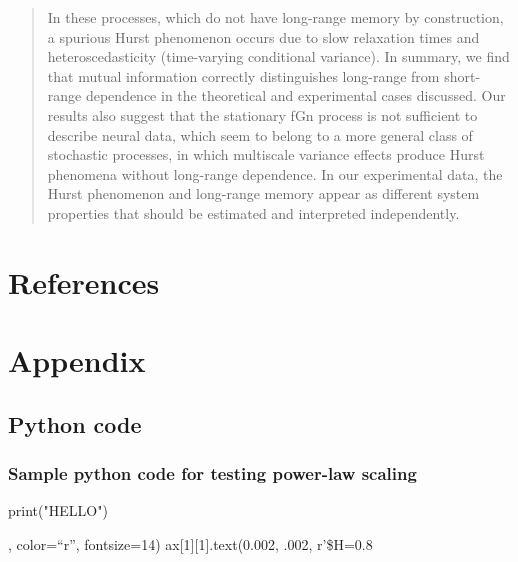 \documentclass[
  sn-vancouver,
  Numbered,
  referee,
  lineno]{sn-jnl}
\newenvironment{Shaded}{\begin{snugshade}}{\end{snugshade}}
\newcommand{\BuiltInTok}[1]{\textcolor[rgb]{0.00,0.23,0.31}{#1}}
\newcommand{\NormalTok}[1]{\textcolor[rgb]{0.00,0.23,0.31}{#1}}
\newcommand{\StringTok}[1]{\textcolor[rgb]{0.13,0.47,0.30}{#1}}
\begin{document}
\begin{quote}
In these processes, which do not have long-range memory by construction,
a spurious Hurst phenomenon occurs due to slow relaxation times and
heteroscedasticity (time-varying conditional variance). In summary, we
find that mutual information correctly distinguishes long-range from
short-range dependence in the theoretical and experimental cases
discussed. Our results also suggest that the stationary fGn process is
not sufficient to describe neural data, which seem to belong to a more
general class of stochastic processes, in which multiscale variance
effects produce Hurst phenomena without long-range dependence. In our
experimental data, the Hurst phenomenon and long-range memory appear as
different system properties that should be estimated and interpreted
independently.
\end{quote}

\newpage{}

\section{References}\label{references}

\renewcommand{\bibsection}{}


\newpage{}

\section{Appendix}\label{appendix}

\subsection{Python code}\label{python-code}

\subsubsection{Sample python code for testing power-law
scaling}\label{sec-powerlawscalingcode}

\begin{Shaded}
\begin{Highlighting}[]
\BuiltInTok{print}\NormalTok{(}\StringTok{"HELLO"}\NormalTok{)}
\end{Highlighting}
\end{Shaded}

, color=``r'', fontsize=14) ax{[}1{]}{[}1{]}.text(0.002, .002, r'\$H=0.8
\end{document}
